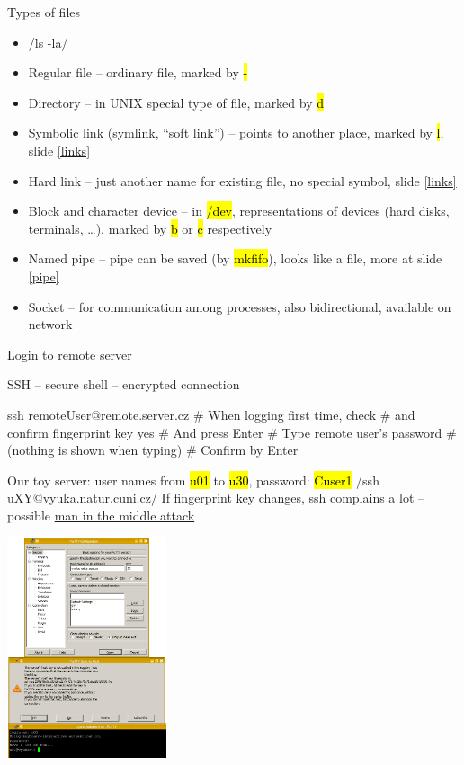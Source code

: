 \documentclass[compress, ucs, xelatex, 11pt, xcolor=svgnames,
  hyperref={
    bookmarks=true,
    unicode=true,
    colorlinks=true,
    pdftitle={Linux, command line and MetaCentrum},
    plainpages=false,
    pdfauthor={Vojtech Zeisek},
    pdfsubject={Course about use of Linux command line, writing shell scripts and using MetaCentrum of CESNET},
    pdfcreator={XeLaTeX},
    pdfkeywords={Linux, GNU, BASH, shell, command line, MetaCentrum},
    linkcolor=Red,
    anchorcolor=Blue,
    citecolor=Purple,
    filecolor=DodgerBlue,
    menucolor=DarkOrchid,
    urlcolor=DeepSkyBlue,
    pdftex},
  url={hyphens, lowtilde} %
  ]{beamer}
\renewcommand{\texttt}[1]{\hl{\ttfamily #1}}
\begin{document}
\begin{frame}{Types of files}
\begin{itemize}
  \item \bash/ls -la/
  \item Regular file -- ordinary file, marked by \texttt{-}
  \item Directory -- in UNIX special type of file, marked by \texttt{d}
  \item Symbolic link (symlink, ``soft link'') -- points to another place, marked by \texttt{l}, slide \ref{links}
  \item Hard link -- just another name for existing file, no special symbol, slide \ref{links}
  \item Block and character device -- in \texttt{/dev}, representations of devices (hard disks, terminals, \ldots), marked by \texttt{b} or \texttt{c} respectively
  \item Named pipe -- pipe can be saved (by \texttt{mkfifo}), looks like a file, more at slide \ref{pipe}
  \item Socket -- for communication among processes, also bidirectional, available on network
\end{itemize}
\end{frame}

\begin{frame}[fragile]{Login to remote server}
\begin{multicols}{2}
  SSH -- secure shell -- encrypted connection
  \begin{bashcode}
    ssh remoteUser@remote.server.cz
    # When logging first time, check
    # and confirm fingerprint key
    yes # And press Enter
    # Type remote user's password
    # (nothing is shown when typing)
    # Confirm by Enter
  \end{bashcode}
  Our toy server: user names from \texttt{u01} to \texttt{u30}, password: \texttt{Cuser1}
  \bash/ssh uXY@vyuka.natur.cuni.cz/
  If fingerprint key changes, ssh complains a lot -- possible \href{https://en.wikipedia.org/wiki/Man-in-the-middle_attack}{man in the middle attack}
  \columnbreak
  \begin{center}
    \includegraphics[height=6.5cm]{putty.png}
  \end{center}
\end{multicols}
\end{frame}
\end{document}
